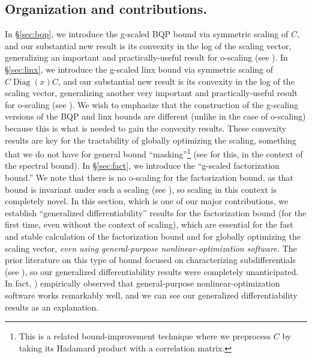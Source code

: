 \documentclass[smallextended]{svjour3hack}       %
\newcommand{\zc}[1]{\noindent{\color{red}[Zhongzhu:]\ {#1}}}
\DeclareMathOperator{\Diag}{Diag}
\begin{document}
\subsection{Organization and contributions.}
In \S\ref{sec:bqp}, we introduce the g-scaled BQP bound via symmetric scaling of $C$, and our substantial new result is its convexity in the log of the scaling vector,
generalizing an important and practically-useful result for o-scaling (see \cite[Theorem 11]{chen_mixing}).
In \S\ref{sec:linx}, we introduce the g-scaled
linx bound  via symmetric scaling of $C\Diag(x)C$,  and our substantial new result is its convexity in the log of the scaling vector,
generalizing another very important and practically-useful
result for o-scaling (see \cite[Theorem 18]{chen_mixing}). We wish to emphasize that
the construction of the g-scaling versions of
the BQP and linx bounds are different (unlike in the case of o-scaling) because this is what is needed to gain the convexity results.
These convexity results are key
for the tractability of globally optimizing the scaling, something that we
do not have for general  bound ``masking''\footnote{This is a related bound-improvement  technique where we preprocess $C$ by taking its Hadamard product with a correlation matrix.} (see \cite{AnstreicherLee_Masked,BurerLee} for this, in the context of the spectral bound).
In \S\ref{sec:fact}, we introduce the ``g-scaled
factorization bound.''
We note that there is no o-scaling for the factorization bound, as that bound is invariant under such a scaling (see \cite[Theorem 2.1]{chen2023computing}),
so scaling in this context is completely novel.
In this section, which is one of our major contributions, we  establish ``generalized differentiability'' results for the factorization bound (for the first time, even without the context of scaling), which are essential for the fast and stable calculation of the factorization bound and for globally optimizing the scaling vector, \emph{even using general-purpose nonlinear-optimization software.}
The prior literature on this type of bound focused on characterizing subdifferentials
(see \cite{nikolov2015randomized,li2020best}),
so our generalized differentiability results
were completely unanticipated.
In fact, \cite{chen2023computing})  empirically observed that general-purpose nonlinear-optimization software
works remarkably well, and we can see our generalized differentiability results as an explanation.
\end{document}
